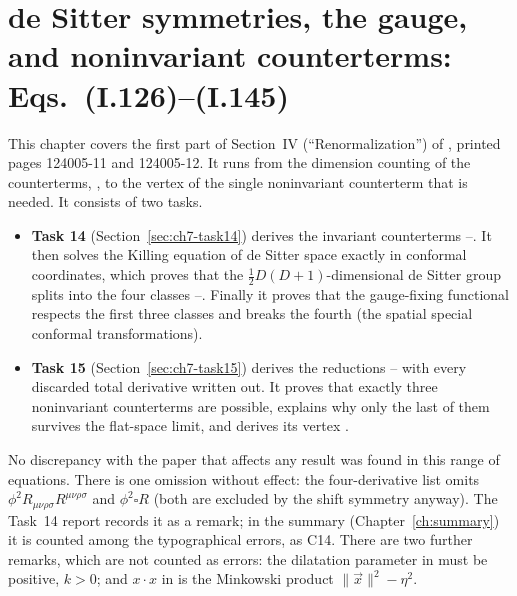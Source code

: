 \providecommand{\chsevLGF}{\mathcal{L}_{\mathrm{GF}}}
\providecommand{\chsevLie}{\pounds}
\providecommand{\chsevct}{\mathcal{L}_{\mathrm{ct}}}

\chapter{de Sitter symmetries, the gauge, and noninvariant counterterms: Eqs.~(I.126)--(I.145)}
\label{ch:desitter-counterterms}

This chapter covers the first part of Section~IV (``Renormalization'') of \PI, printed pages 124005-11 and 124005-12.
It runs from the dimension counting of the counterterms, , to the vertex  of the single noninvariant counterterm that is needed.
It consists of two tasks.
\begin{itemize}[leftmargin=14pt]
\item \textbf{Task 14} (Section~\ref{sec:ch7-task14}) derives the invariant counterterms --.
It then solves the Killing equation of de Sitter space exactly in conformal coordinates, which proves that the $\tfrac12D(D+1)$-dimensional de Sitter group splits into the four classes --.
Finally it proves that the gauge-fixing functional  respects the first three classes and breaks the fourth (the spatial special conformal transformations).
\item \textbf{Task 15} (Section~\ref{sec:ch7-task15}) derives the reductions -- with every discarded total derivative written out.
It proves that exactly three noninvariant counterterms  are possible, explains why only the last of them survives the flat-space limit, and derives its vertex .
\end{itemize}
No discrepancy with the paper that affects any result was found in this range of equations.
There is one omission without effect: the four-derivative list  omits $\phi^2R_{\mu\nu\rho\sigma}R^{\mu\nu\rho\sigma}$ and $\phi^2\square R$
(both are excluded by the shift symmetry anyway). The Task~14 report records it as a remark; in the summary (Chapter~\ref{ch:summary}) it is counted
among the typographical errors, as C14.
There are two further remarks, which are not counted as errors:
the dilatation parameter in  must be positive, $k>0$;
and $x\cdot x$ in  is the Minkowski product $\|\vec x\|^2-\eta^2$.

